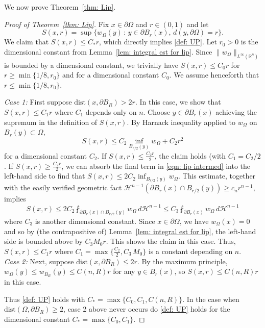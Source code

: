 \documentclass[10pt, reqno]{amsart}
\numberwithin{equation}{section}
\def\R{{\mathbb R}}
\def\W{\Omega}
\begin{document}
We now prove Theorem~\ref{thm: Lip}. 
\begin{proof}[Proof of Theorem~\ref{thm: Lip}]
Fix $x \in \partial \W$ and $r\in(0,1)$ and let 
$$S(x,r) = \sup\{ w_\W(y)\,  : \, y \in \partial B_r(x),  \, d(y,\partial \W) = r\}.$$
We claim that $S(x,r) \leq C_*r$, which directly implies \eqref{def: UP}. 
Let $r_0>0$ is the dimensional constant from Lemma~\ref{lem: integral est for lip}. Since $\|w_\W\|_{L^\infty(\R^n)}$ is bounded by a dimensional constant, we trivially have $S(x,r) \leq C_0 r$ for $r\geq \min\{1/8, r_0\}$ and for a dimensional constant $C_0$. We assume henceforth that $r \leq \min\{1/8, r_0\}$.



{\it Case 1:} First suppose $\text{dist}(x, \partial B_R) > 2r.$ 
%
In this case, we show that $S(x,r) \leq C_1 r$ where $C_1$ depends only on $n$. 
%
Choose $y \in \partial B_r(x)$ achieving the supremum in the definition of $S(x,r)$. 
%
By Harnack inequality applied to $w_\W$ on $B_r(y) \subset \W$, 
\begin{equation}\label{eqn: lip intermed}
S(x,r) \leq C_2 \inf_{B_{r/2}(y)} w_\W + C_2r^2
\end{equation}
for a dimensional constant $C_2$.
If $S(x,r) \leq \tfrac{C_2r}{2}$,  the claim holds (with $C_1 =C_2/2$. If $S(x,r) \geq \tfrac{C_2r}{2}$,  we can absorb the final term in \eqref{eqn: lip intermed} into the left-hand side to find that $S(x,r) \leq 2C_2 \inf_{B_{r/2}(y)} w_\W$. 
This estimate, together with the easily verified geometric fact $\mathcal{H}^{n-1}(\partial B_r(x) \cap B_{r/2}(y) ) \geq c_n r^{n-1}$, implies
\[
S(x,r) \leq 2C_2 \fint_{\partial B_r(x)\cap B_{r/2}(y) } w_\W \, d\mathcal{H}^{n-1} \leq C_3\fint_{\partial B_r(x)} w_\W \, d\mathcal{H}^{n-1}
\]
where $C_3$ is another dimensional constant.
Since $x \in \partial \W$, we have $w_\W (x)=0$ and so by (the contrapositive of) Lemma~\ref{lem: integral est for lip}, the left-hand side is bounded above by $C_3 M_0 r$.  This shows the claim in this case. Thus, $S(x,r) \leq C_1r$ where $C_1 = \max\{ \tfrac{C_2}{2}, C_3 \, M_0\}$ is a constant depending on $n$.
\\


{\it Case 2: } Next, suppose  $\text{dist}(x, \partial B_R) \leq 2r.$ By the maximum principle, $w_\W(y) \leq w_{B_R}(y) \leq C(n,R) r$ for any $y \in B_r(x)$, so $S(x,r) \leq C(n,R)r$ in this case.

Thus \eqref{def: UP} holds with $C_* = \max \{ C_0, C_1, C(n,R)\}$. In the case when $\text{dist}(\W , \partial B_R) \geq 2$, case 2 above never occurs do \eqref{def: UP} holds for the dimensional constant  $C_* = \max \{ C_0, C_1\}$.
\end{proof}
\end{document}
